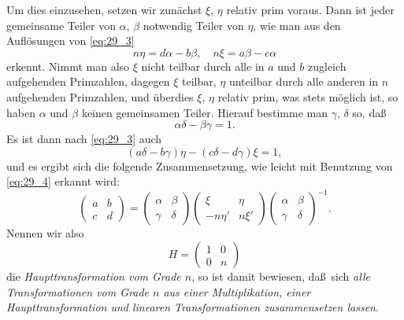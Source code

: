 \documentclass[12pt,a4paper]{article}
\begin{document}
Um dies einzusehen, setzen wir zun\"achst $\xi$, $\eta$ relativ prim voraus. Dann ist jeder gemeinsame Teiler von $\alpha$, $\beta$ notwendig Teiler von $\eta$, wie man aus den Aufl\"osungen von \eqref{eq:29_3}
\begin{equation}\label{eq:29_4}
n\eta = d\alpha-b\beta,\quad n\xi = a\beta-c\alpha
\end{equation}
erkennt. Nimmt man also $\xi$ nicht teilbar durch alle in $a$ und $b$ zugleich aufgehenden Primzahlen, dagegen $\xi$ teilbar, $\eta$ unteilbar durch alle anderen in $n$ aufgehenden Primzahlen, und \"uberdies $\xi$, $\eta$ relativ prim, was stets m\"oglich ist, so haben $\alpha$ und $\beta$ keinen gemeinsamen Teiler. Hierauf bestimme man $\gamma$, $\delta$ so, da\ss
\[
\alpha\delta-\beta\gamma=1.
\]
Es ist dann nach \eqref{eq:29_3} auch
\[
(a\delta-b\gamma)\eta-(c\delta-d\gamma)\xi=1,
\]
und es ergibt sich die folgende Zusammensetzung, wie leicht mit Benutzung von \eqref{eq:29_4} erkannt wird:
\begin{equation}\label{eq:29_5}
\begin{pmatrix} a & b \\ c & d \end{pmatrix} = \begin{pmatrix} \alpha & \beta \\ \gamma & \delta \end{pmatrix}\begin{pmatrix} \xi & \eta \\ -n\eta' & n\xi' \end{pmatrix}\begin{pmatrix} \alpha & \beta \\ \gamma & \delta \end{pmatrix}^{-1}.
\end{equation}
Nennen wir also
\begin{equation}\label{eq:29_6}
H = \begin{pmatrix} 1 & 0 \\ 0 & n \end{pmatrix}
\end{equation}
die \emph{Haupttransformation vom Grade $n$}, so ist damit bewiesen, da\ss\ sich \emph{alle Transformationen vom Grade $n$ aus einer Multiplikation, einer Haupttransformation und linearen Transformationen zusammensetzen lassen}.
\end{document}

